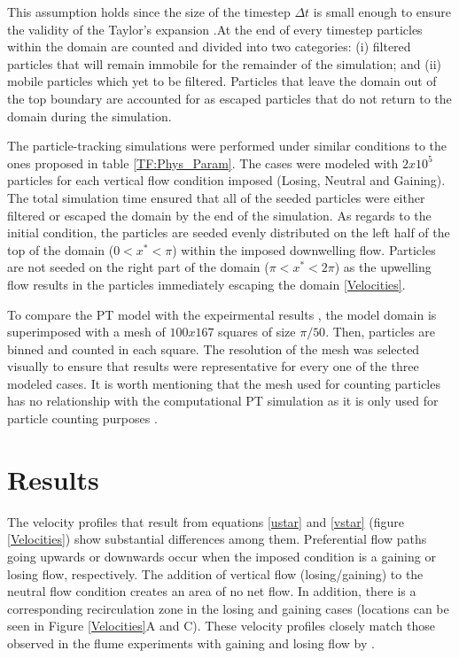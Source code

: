 \documentclass[draft,linenumbers]{agujournal2018}
\begin{document}
This assumption holds since the size of the timestep $\Delta t$ is small enough to ensure the validity of the Taylor's expansion \citep{Li2017}.At the end of every timestep particles within the domain are counted and divided into two categories: (i) filtered particles that will remain immobile for the remainder of the simulation; and (ii) mobile particles which yet to be filtered. Particles that leave the domain out of the top boundary are accounted for as escaped particles that do not return to the domain during the simulation.

The particle-tracking simulations were performed under similar conditions to the ones proposed in table \ref{TF:Phys_Param}. The cases were modeled with $2x10^5$ particles for each vertical flow condition imposed (Losing, Neutral and Gaining). The total simulation time ensured that all of the seeded particles were either filtered or escaped the domain by the end of the simulation. As regards to the initial condition, the particles are seeded evenly distributed on the left half of the top of the domain ($0 < x^* < \pi$) within the imposed downwelling flow. Particles are not seeded on the right part of the domain ($\pi < x^* < 2\pi$) as the upwelling flow results in the particles immediately escaping the domain  \ref{Velocities}. 

To compare the PT model with the expeirmental results \citep{Fox2014,Fox2018}, the model domain is superimposed with a mesh of $100 x 167$ squares of size $\pi / 50$. Then, particles are binned and counted in each square. The resolution of the mesh was selected visually to ensure that results were representative for every one of the three modeled cases. It is worth mentioning that the mesh used for counting particles has no relationship with the computational PT simulation as it is only used for particle counting purposes \citep{Xue2017}.

\section{Results}  \label{Results}

The velocity profiles that result from equations \ref{ustar} and \ref{vstar} (figure \ref{Velocities}) show substantial differences among them. Preferential flow paths going upwards or downwards occur when the imposed condition is a gaining or losing flow, respectively. The addition of vertical flow (losing/gaining) to the neutral flow condition creates an area of no net flow. In addition, there is a corresponding recirculation zone in the losing and gaining cases (locations can be seen in Figure \ref{Velocities}A and C). These velocity profiles closely match those observed in the flume experiments with gaining and losing flow by \citet{Fox2018}.
\end{document}
